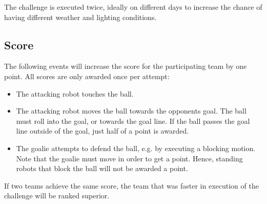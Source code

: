 \documentclass[12pt]{article}
\begin{document}
The challenge is executed twice, ideally on different days to increase the chance of having different weather and lighting conditions.

\subsection{Score}
The following events will increase the score for the participating team by one point. All scores are only awarded once per attempt:

\begin{itemize}
\item The attacking robot touches the ball. 
\item The attacking robot moves the ball towards the opponents goal. The ball must roll into the goal, or towards the goal line. If the ball passes the goal line outside of the goal, just half of a point is awarded.
\item The goalie attempts to defend the ball, e.g. by executing a blocking motion. Note that the goalie must move in order to get a point. Hence, standing robots that block the ball will not be awarded a point.

\end{itemize}
If two teams achieve the same score, the team that was faster in execution of the challenge will be ranked superior.
\end{document}
